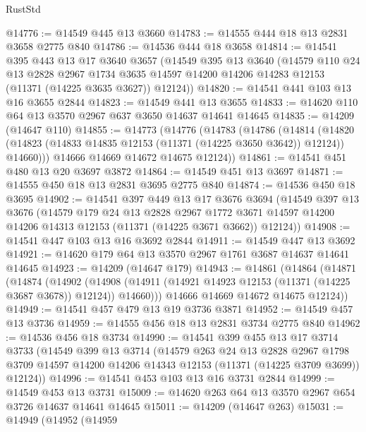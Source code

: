 \begin{lexlean}{RustStd}
\begin{coremodule}
@14776 := @14549 @445 @13 @3660
@14783 := @14555 @444 @18 @13 @2831 @3658 @2775 @840
@14786 := @14536 @444 @18 @3658
@14814 := @14541
    @395
    @443
    @13
    @17
    @3640
    @3657
    (@14549
      @395
      @13
      @3640
      (@14579
        @110
        @24
        @13
        @2828
        @2967
        @1734
        @3635
        @14597
        @14200
        @14206
        @14283
        @12153
        (@11371 (@14225 @3635 @3627))
        @12124))
@14820 := @14541 @441 @103 @13 @16 @3655 @2844
@14823 := @14549 @441 @13 @3655
@14833 := @14620 @110 @64 @13 @3570 @2967 @637 @3650 @14637 @14641 @14645
@14835 := @14209 (@14647 @110)
@14855 := @14773
    (@14776
      (@14783
        (@14786
          (@14814
            (@14820 (@14823 (@14833 @14835 @12153 (@11371 (@14225 @3650 @3642)) @12124)) @14660)))
        @14666
        @14669
        @14672
        @14675
        @12124))
@14861 := @14541 @451 @480 @13 @20 @3697 @3872
@14864 := @14549 @451 @13 @3697
@14871 := @14555 @450 @18 @13 @2831 @3695 @2775 @840
@14874 := @14536 @450 @18 @3695
@14902 := @14541
    @397
    @449
    @13
    @17
    @3676
    @3694
    (@14549
      @397
      @13
      @3676
      (@14579
        @179
        @24
        @13
        @2828
        @2967
        @1772
        @3671
        @14597
        @14200
        @14206
        @14313
        @12153
        (@11371 (@14225 @3671 @3662))
        @12124))
@14908 := @14541 @447 @103 @13 @16 @3692 @2844
@14911 := @14549 @447 @13 @3692
@14921 := @14620 @179 @64 @13 @3570 @2967 @1761 @3687 @14637 @14641 @14645
@14923 := @14209 (@14647 @179)
@14943 := @14861
    (@14864
      (@14871
        (@14874
          (@14902
            (@14908 (@14911 (@14921 @14923 @12153 (@11371 (@14225 @3687 @3678)) @12124)) @14660)))
        @14666
        @14669
        @14672
        @14675
        @12124))
@14949 := @14541 @457 @479 @13 @19 @3736 @3871
@14952 := @14549 @457 @13 @3736
@14959 := @14555 @456 @18 @13 @2831 @3734 @2775 @840
@14962 := @14536 @456 @18 @3734
@14990 := @14541
    @399
    @455
    @13
    @17
    @3714
    @3733
    (@14549
      @399
      @13
      @3714
      (@14579
        @263
        @24
        @13
        @2828
        @2967
        @1798
        @3709
        @14597
        @14200
        @14206
        @14343
        @12153
        (@11371 (@14225 @3709 @3699))
        @12124))
@14996 := @14541 @453 @103 @13 @16 @3731 @2844
@14999 := @14549 @453 @13 @3731
@15009 := @14620 @263 @64 @13 @3570 @2967 @654 @3726 @14637 @14641 @14645
@15011 := @14209 (@14647 @263)
@15031 := @14949
    (@14952
      (@14959

\end{coremodule}
\end{lexlean}
